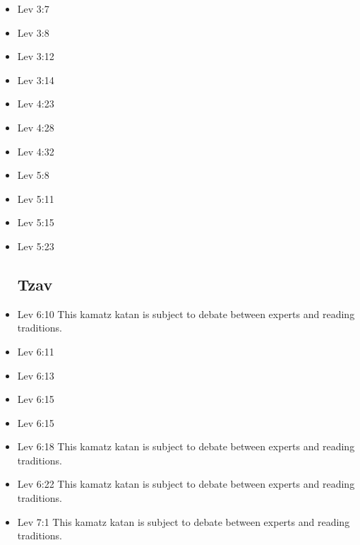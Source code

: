 \documentclass[14pt]{book}
\begin{document}
\begin{multicols}{2}
\begin{itemize}
\item Lev 3:7

\item Lev 3:8

\item Lev 3:12

\item Lev 3:14

\item Lev 4:23

\item Lev 4:28

\item Lev 4:32

\item Lev 5:8

\item Lev 5:11

\item Lev 5:15

\item Lev 5:23

\subsection{Tzav}

\item Lev 6:10 This kamatz katan is subject to debate between experts and reading traditions.

\item Lev 6:11

\item Lev 6:13

\item Lev 6:15

\item Lev 6:15

\item Lev 6:18 This kamatz katan is subject to debate between experts and reading traditions.

\item Lev 6:22 This kamatz katan is subject to debate between experts and reading traditions.

\item Lev 7:1 This kamatz katan is subject to debate between experts and reading traditions.


\end{itemize}
\end{multicols}
\end{document}
